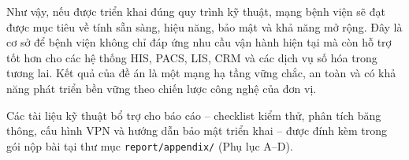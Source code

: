 Như vậy, nếu được triển khai đúng quy trình kỹ thuật, mạng bệnh viện sẽ đạt được mục tiêu về tính sẵn sàng, hiệu năng, bảo mật và khả năng mở rộng. Đây là cơ sở để bệnh viện không chỉ đáp ứng nhu cầu vận hành hiện tại mà còn hỗ trợ tốt hơn cho các hệ thống HIS, PACS, LIS, CRM và các dịch vụ số hóa trong tương lai. Kết quả của đề án là một mạng hạ tầng vững chắc, an toàn và có khả năng phát triển bền vững theo chiến lược công nghệ của đơn vị.

Các tài liệu kỹ thuật bổ trợ cho báo cáo -- checklist kiểm thử, phân tích băng thông, cấu hình VPN và hướng dẫn bảo mật triển khai -- được đính kèm trong gói nộp bài tại thư mục \texttt{report/appendix/} (Phụ lục A--D).
